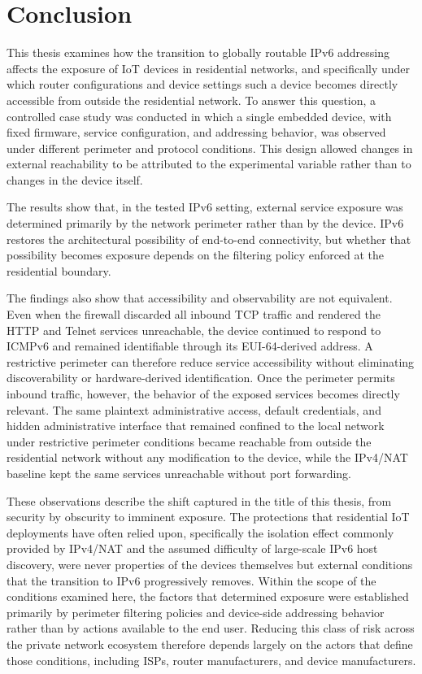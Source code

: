 \chapter{Conclusion}\label{chap:conclusion}

This thesis examines how the transition to globally routable IPv6 addressing affects the exposure of IoT devices in residential networks, and specifically under which router configurations and device settings such a device becomes directly accessible from outside the residential network. To answer this question, a controlled case study was conducted in which a single embedded device, with fixed firmware, service configuration, and addressing behavior, was observed under different perimeter and protocol conditions. This design allowed changes in external reachability to be attributed to the experimental variable rather than to changes in the device itself.

The results show that, in the tested IPv6 setting, external service exposure was determined primarily by the network perimeter rather than by the device. IPv6 restores the architectural possibility of end-to-end connectivity, but whether that possibility becomes exposure depends on the filtering policy enforced at the residential boundary.

The findings also show that accessibility and observability are not equivalent. Even when the firewall discarded all inbound TCP traffic and rendered the HTTP and Telnet services unreachable, the device continued to respond to ICMPv6 and remained identifiable through its EUI-64-derived address. A restrictive perimeter can therefore reduce service accessibility without eliminating discoverability or hardware-derived identification. Once the perimeter permits inbound traffic, however, the behavior of the exposed services becomes directly relevant. The same plaintext administrative access, default credentials, and hidden administrative interface that remained confined to the local network under restrictive perimeter conditions became reachable from outside the residential network without any modification to the device, while the IPv4/NAT baseline kept the same services unreachable without port forwarding.

These observations describe the shift captured in the title of this thesis, from security by obscurity to imminent exposure. The protections that residential IoT deployments have often relied upon, specifically the isolation effect commonly provided by IPv4/NAT and the assumed difficulty of large-scale IPv6 host discovery, were never properties of the devices themselves but external conditions that the transition to IPv6 progressively removes. Within the scope of the conditions examined here, the factors that determined exposure were established primarily by perimeter filtering policies and device-side addressing behavior rather than by actions available to the end user. Reducing this class of risk across the private network ecosystem therefore depends largely on the actors that define those conditions, including ISPs, router manufacturers, and device manufacturers.

